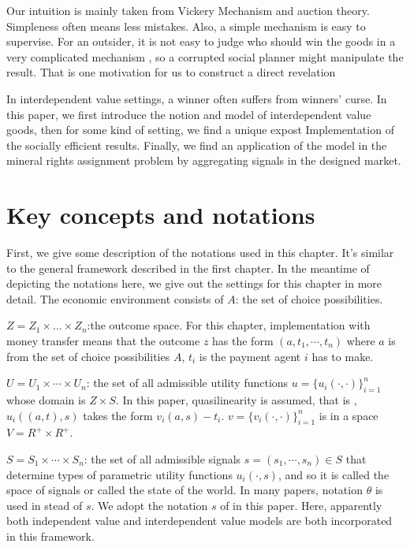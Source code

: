  
 Our intuition is mainly taken from \parencite{Maskin00} Vickery Mechanism and auction theory. 
Simpleness often means less mistakes. Also, a simple mechanism is  easy to supervise. For an outsider, it is not easy to judge who should win the goods in a very complicated mechanism
, so a corrupted social planner might manipulate the result. That is one motivation for us to construct a direct revelation

In interdependent value settings, a winner often suffers from winners' curse. In this paper, we first introduce the notion and model
of interdependent value goods, then for some kind of setting, we find a unique expost Implementation of 
the socially efficient results. Finally, we find an application of the model in the mineral rights assignment problem by aggregating
signals in the designed market.




\section{Key concepts and notations}
First, we give some description of the notations used in this chapter. It's similar to the general framework described in the first chapter. In the meantime of depicting the notations here, we give out the settings for this 
chapter in more detail.
The economic environment consists of
$A$: the set of choice possibilities.

$Z=Z_1\times \dots\times Z_n$:the outcome space. For this chapter, implementation with money transfer means that the 
outcome $z$ has the form $(a, t_1,\cdots,t_n)$ where $a$ is from the set of choice possibilities $A$, $t_i$ is 
the payment agent $i$ has to make.

$U=U_1\times \cdots\times U_n$: the set of all admissible utility functions  $u = \{u_i(\cdot, \cdot)\}_{i=1}^n$ whose 
domain is $Z\times S$. In this paper, quasilinearity is assumed, that is , $u_i((a,t), s)$ takes the form $v_i(a,s)-t_i$. 
$v=\{v_i(\cdot, \cdot)\}_{i=1}^n$ is in a space $V=R^+\times R^+$.

$S=S_1\times \cdots\times S_n$: the set of all admissible signals $s=(s_1,\cdots,s_n)\in S$ that determine types of 
parametric utility functions $u_i(\cdot, s)$, and so it is called the space of signals or called the state of the world. 
In many papers, notation $\theta$ is used in stead of $s$. We adopt the notation $s$ of \parencite{Maskin00} in this paper.
Here, apparently both independent value and interdependent value models are both incorporated in this framework.


